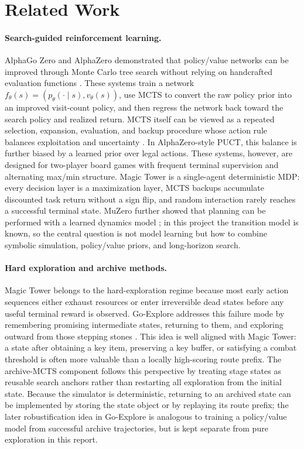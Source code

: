 \documentclass{article}
\begin{document}
\section{Related Work}
\paragraph{Search-guided reinforcement learning.}
AlphaGo Zero and AlphaZero demonstrated that policy/value networks can be
improved through Monte Carlo tree search without relying on handcrafted
evaluation functions \citep{silver2017mastering,silver2018general}.  These
systems train a network \(f_\theta(s)=(p_\theta(\cdot\mid s),v_\theta(s))\),
use MCTS to convert the raw policy prior into an improved visit-count policy,
and then regress the network back toward the search policy and realized return.
MCTS itself can be viewed as a repeated selection, expansion, evaluation, and
backup procedure whose action rule balances exploitation and uncertainty
\citep{kocsis2006bandit,browne2012survey}.  In AlphaZero-style PUCT, this
balance is further biased by a learned prior over legal actions.  These
systems, however, are designed for two-player board games with frequent
terminal supervision and alternating max/min structure.  Magic Tower is a
single-agent deterministic MDP: every decision layer is a maximization layer,
MCTS backups accumulate discounted task return without a sign flip, and random
interaction rarely reaches a successful terminal state.  MuZero further showed
that planning can be performed with a learned dynamics model
\citep{schrittwieser2020muzero}; in this project the transition model is known,
so the central question is not model learning but how to combine symbolic
simulation, policy/value priors, and long-horizon search.

\paragraph{Hard exploration and archive methods.}
Magic Tower belongs to the hard-exploration regime because most early action
sequences either exhaust resources or enter irreversible dead states before any
useful terminal reward is observed.  Go-Explore addresses this failure mode by
remembering promising intermediate states, returning to them, and exploring
outward from those stepping stones \citep{ecoffet2019goexplore}.  This idea is
well aligned with Magic Tower: a state after obtaining a key item, preserving a
key buffer, or satisfying a combat threshold is often more valuable than a
locally high-scoring route prefix.  The archive-MCTS component follows this
perspective by treating stage states as reusable search anchors rather than
restarting all exploration from the initial state.  Because the simulator is
deterministic, returning to an archived state can be implemented by storing the
state object or by replaying its route prefix; the later robustification idea in
Go-Explore is analogous to training a policy/value model from successful archive
trajectories, but is kept separate from pure exploration in this report.
\end{document}
